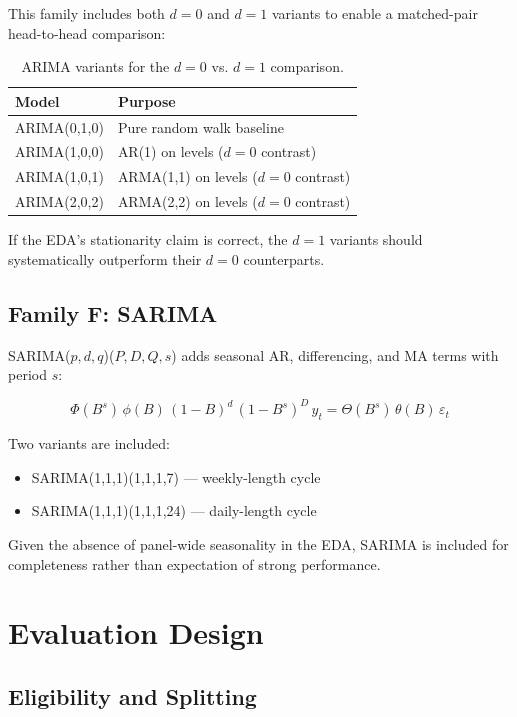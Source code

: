 This family includes both $d = 0$ and $d = 1$ variants to enable a matched-pair head-to-head comparison:

\begin{table}[H]
\centering
\caption{ARIMA variants for the $d=0$ vs. $d=1$ comparison.}
\begin{tabular}{ll}
\toprule
\textbf{Model} & \textbf{Purpose} \\
\midrule
ARIMA(0,1,0) & Pure random walk baseline \\
ARIMA(1,0,0) & AR(1) on levels ($d=0$ contrast) \\
ARIMA(1,0,1) & ARMA(1,1) on levels ($d=0$ contrast) \\
ARIMA(2,0,2) & ARMA(2,2) on levels ($d=0$ contrast) \\
\bottomrule
\end{tabular}
\end{table}

If the EDA's stationarity claim is correct, the $d=1$ variants should systematically outperform their $d=0$ counterparts.

\subsection{Family F: SARIMA}

SARIMA($p, d, q$)($P, D, Q, s$) adds seasonal AR, differencing, and MA terms with period $s$:

\begin{equation}
\Phi(B^s)\, \phi(B)\, (1-B)^d\, (1-B^s)^D\, y_t = \Theta(B^s)\, \theta(B)\, \varepsilon_t
\end{equation}

Two variants are included:
\begin{itemize}
    \item SARIMA(1,1,1)(1,1,1,7) --- weekly-length cycle
    \item SARIMA(1,1,1)(1,1,1,24) --- daily-length cycle
\end{itemize}

Given the absence of panel-wide seasonality in the EDA, SARIMA is included for completeness rather than expectation of strong performance.

\section{Evaluation Design}

\subsection{Eligibility and Splitting}

